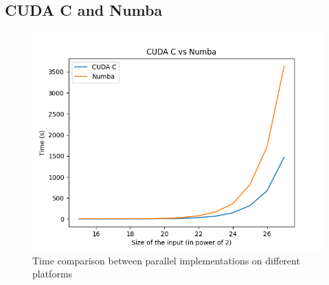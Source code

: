 \documentclass[a4paper, 12pt, oneside]{article}
\begin{document}
\subsection{CUDA C and Numba}

\begin{figure}[!h]
  \includegraphics[width=400pt]{images/cpp_vs_py.png}
  \caption{Time comparison between parallel implementations on different platforms}
\end{figure}
\end{document}
